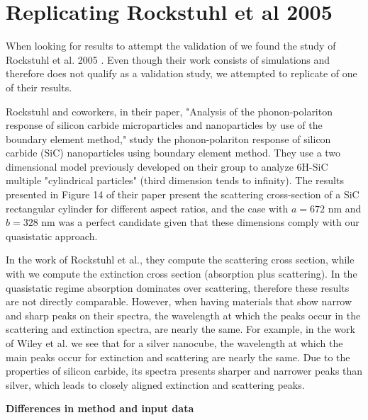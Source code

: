 
\section{Replicating Rockstuhl et al 2005} \label{sec:rep_rockstuhl}
\graphicspath{{replication_validation/figs/}}

When looking for results to attempt the validation of \pygbe we found the study of Rockstuhl et al. 2005 \cite{rockstuhl2005}. 
Even though their work consists of simulations and therefore does not qualify as a validation study, we 
attempted to replicate of one of their results. 

Rockstuhl and coworkers, in their paper, "Analysis of the phonon-polariton response of silicon carbide microparticles 
and nanoparticles by use of the boundary element method," study the phonon-polariton response of silicon carbide (SiC)
nanoparticles using boundary element method. They use a two dimensional model previously developed on their group \cite{rockstuhl2003}
to analyze 6H-SiC multiple "cylindrical particles" (third dimension tends to infinity). The results presented in Figure 14 of their paper  
present the scattering cross-section of a SiC rectangular cylinder for different aspect ratios, and the case with $a = 672$ nm and $b = 328$ nm
was a perfect candidate given that these dimensions comply with our quasistatic approach.

In the work of Rockstuhl et al., they compute the scattering cross section, while with \pygbe we compute the extinction cross section 
(absorption plus scattering). In the quasistatic regime absorption dominates over scattering, therefore these results are not directly
comparable. However, when having materials that show narrow and sharp peaks on their spectra, the wavelength at which the peaks occur 
in the scattering and extinction spectra, are nearly the same. For example, in the work of Wiley et al. \cite{wiley-etal-2006}
we see that for a silver nanocube, the wavelength at which the main peaks occur for extinction and scattering are nearly the same. Due to the properties 
of silicon carbide, its spectra presents sharper and narrower peaks than silver, which leads to closely aligned extinction and scattering peaks.

\textbf{Differences in method and input data}

